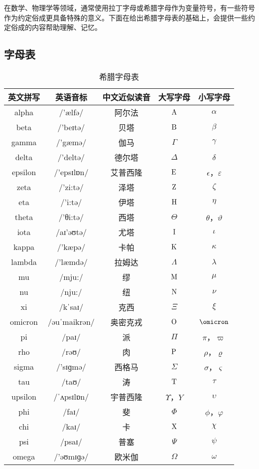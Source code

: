 \begin{issues}
\issueDraft
\end{issues}

在数学、物理学等领域，通常使用拉丁字母或希腊字母作为变量符号，有一些符号作为约定俗成更具备特殊的意义。下面在给出希腊字母表的基础上，会提供一些约定俗成的内容帮助理解、记忆。

\subsection{字母表}

\begin{table}[ht]
\centering
\caption{希腊字母表}\label{tab_GreekL1}
\begin{tabular}{|c|c|c|c|c|}
\hline
英文拼写 & 英语音标 & 中文近似读音 & 大写字母 & 小写字母 \\
\hline
alpha & /'ælfə/&阿尔法 & ${\rm A}$ & $\alpha$ \\
\hline
beta & /'beɪtə/&贝塔 & ${\rm B}$ & $\beta$ \\
\hline
gamma & /'gæmə/&伽马 & $\Gamma$ & $\gamma$ \\
\hline
delta & /'deltə/&德尔塔 &$\Delta$ & $\delta$ \\
\hline
epsilon & /'epsɪlɒn/&艾普西隆 & ${\rm E}$ & $\epsilon$，$\varepsilon$ \\
\hline
zeta & /'zi:tə/&泽塔 & ${\rm Z}$ & $\zeta$ \\
\hline
eta & /'i:tə/&伊塔 & ${\rm H}$ & $\eta$ \\
\hline
theta & /'θi:tə/&西塔 & $\Theta$ & $\theta$，$\vartheta$ \\
\hline
iota & /aɪ'əʊtə/&尤塔 & ${\rm I}$ & $\iota$ \\
\hline
kappa & /'kæpə/&卡帕 & ${\rm K}$ & $\kappa$ \\
\hline
lambda & /'læmdə/&拉姆达 &$\Lambda$ & $\lambda$ \\
\hline
mu & /mju:/&缪 & ${\rm M}$ & $\mu$ \\
\hline
nu & /nju:/&纽 & ${\rm N}$ & $\nu$ \\
\hline
xi & /kˈsaɪ/&克西 &$\Xi$ & $\xi$ \\
\hline
omicron &/əuˈmaikrən/&奥密克戎 & ${\rm O}$ & $\omicron$ \\
\hline
pi & /paɪ/&派 &$\Pi$ & $\pi$，$\varpi$ \\
\hline
rho & /rəʊ/&肉 & ${\rm P}$ & $\rho$，$\varrho$ \\
\hline
sigma & /'sɪɡmə/&西格马 & $\Sigma$ & $\sigma$，$\varsigma$ \\
\hline
tau & /taʊ/&涛 & ${\rm T}$ & $\tau$ \\
\hline
upsilon & /ˈʌpsɪlɒn/&宇普西隆 & $\Upsilon$，${Y}$ & $\upsilon$ \\
\hline
phi & /faɪ/&斐 &$\Phi$ & $\phi$，$\varphi$ \\
\hline
chi & /kaɪ/&卡 & ${\rm X}$ & $\chi$ \\
\hline
psi & /psaɪ/&普塞 & $\Psi$ & $\psi$ \\
\hline
omega & /'əʊmɪɡə/&欧米伽 & $\Omega$ & $\omega$ \\
\hline
\end{tabular}
\end{table}

